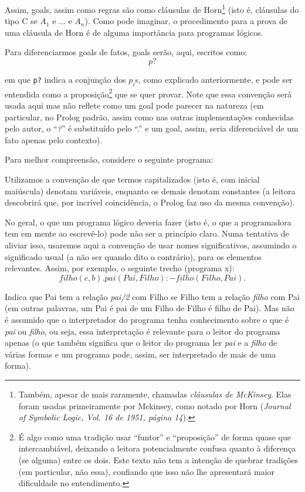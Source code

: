 \documentclass{article}
\theoremstyle{definition}
\theoremstyle{remark}
\begin{document}
Assim, goals, assim como regras são como cláusulas de Horn\footnote{Também, apesar de mais raramente, chamadas \textit{cláusulas de McKinsey}. Elas foram usadas primeiramente por Mckinsey, como notado por Horn (\textit{Journal of Symbolic Logic, Vol. 16 de 1951, página 14}).} (isto é, cláusulas do tipo C se $A_1$ e ... e $A_n$). Como pode imaginar, o procedimento para a prova de uma cláusula de Horn é de alguma importância para programas lógicos.

Para diferenciarmos goals de fatos, goals serão, aqui, escritos como:
\[
  p?
\]

\noindent em que {\tt p?} indica a conjunção dos $p_i$s, como explicado anteriormente, e pode ser entendida como a proposição\footnote{É algo como uma tradição usar ``funtor'' e ``proposição'' de forma quase que intercambiável, deixando a leitora potencialmente confusa quanto à diferença (se alguma) entre os dois. Este texto não tem a intenção de quebrar tradições (em particular, não essa), confiando que isso não lhe apresentará maior dificuldade no entendimento.} que se quer provar. Note que essa convenção será usada aqui mas não reflete como um goal pode parecer na natureza (em particular, no
Prolog padrão, assim como nas outras implementações conhecidas pelo autor, o ``\textit{?}'' é substituído pelo ``.'' e um goal, assim, seria diferenciável de um fato apenas pelo contexto).

Para melhor compreensão, considere o seguinte programa:



Utilizamos a convenção de que termos capitalizados (isto é, com inicial maiúscula) denotam variáveis, enquanto os demais denotam constantes (a leitora descobrirá que, por incrível coincidência, o Prolog faz uso da mesma convenção).

No geral, o que um programa lógico deveria fazer (isto é, o que a programadora tem em mente ao escrevê-lo) pode não ser a princípio claro. Numa tentativa de aliviar isso, usaremos aqui a convenção de usar nomes significativos, assumindo o significado usual (a não ser quando dito o contrário), para os elementos relevantes. Assim, por exemplo, o seguinte trecho (programa x):
\[
  filho(c,b).
  pai(Pai, Filho) :- filho(Filho, Pai).
\]

Indica que Pai tem a relação \textit{pai/2} com Filho se Filho tem a relação \textit{filho} com Pai (em outras palavras, um Pai é pai de um Filho de Filho é filho de Pai). Mas não é assumido que o interpretador do programa tenha conhecimento sobre o que é \textit{pai} ou \textit{filho}, ou seja, essa interpretação é relevante para o leitor do programa apenas (o que também significa que o leitor do programa ler \textit{pai} e a \textit{filho} de várias formas e um programa pode, assim,
ser interpretado de mais de uma forma).
\end{document}
